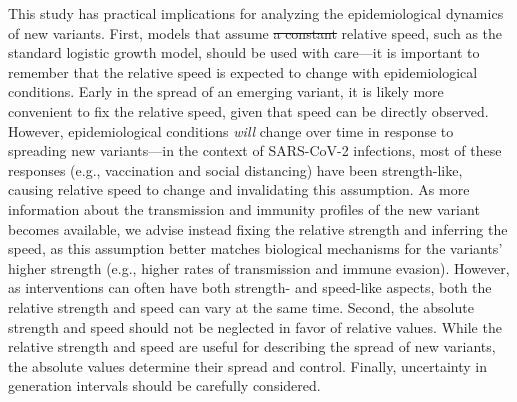 \documentclass[12pt]{article}
\providecommand{\DIFaddtex}[1]{{\protect\color{blue}\uwave{#1}}} %
\providecommand{\DIFdeltex}[1]{{\protect\color{red}\sout{#1}}}                      %
\providecommand{\DIFaddbegin}{} %
\providecommand{\DIFaddend}{} %
\providecommand{\DIFdelbegin}{} %
\providecommand{\DIFdelend}{} %
\providecommand{\DIFadd}[1]{\texorpdfstring{\DIFaddtex{#1}}{#1}} %
\providecommand{\DIFdel}[1]{\texorpdfstring{\DIFdeltex{#1}}{}} %
\newcommand{\DIFscaledelfig}{0.5}
\newlength{\DIFdelgraphicswidth} %
\newlength{\DIFdelgraphicsheight} %
\newcommand{\DIFaddincludegraphics}[2][]{{\color{blue}\fbox{\DIFOincludegraphics[#1]{#2}}}} %
\newcommand{\DIFdelincludegraphics}[2][]{%
\sbox{\DIFdelgraphicsbox}{\DIFOincludegraphics[#1]{#2}}%
\settoboxwidth{\DIFdelgraphicswidth}{\DIFdelgraphicsbox} %
\settoboxtotalheight{\DIFdelgraphicsheight}{\DIFdelgraphicsbox} %
\scalebox{\DIFscaledelfig}{%
\parbox[b]{\DIFdelgraphicswidth}{\usebox{\DIFdelgraphicsbox}\\[-\baselineskip] \rule{\DIFdelgraphicswidth}{0em}}\llap{\resizebox{\DIFdelgraphicswidth}{\DIFdelgraphicsheight}{%
\setlength{\unitlength}{\DIFdelgraphicswidth}%
\begin{picture}(1,1)%
\thicklines\linethickness{2pt} %
{\color[rgb]{1,0,0}\put(0,0){\framebox(1,1){}}}%
{\color[rgb]{1,0,0}\put(0,0){\line( 1,1){1}}}%
{\color[rgb]{1,0,0}\put(0,1){\line(1,-1){1}}}%
\end{picture}%
}\hspace*{3pt}}} %
} %
\DeclareRobustCommand{\DIFaddbegin}{\DIFOaddbegin \let\includegraphics\DIFaddincludegraphics} %
\DeclareRobustCommand{\DIFaddend}{\DIFOaddend \let\includegraphics\DIFOincludegraphics} %
\DeclareRobustCommand{\DIFdelbegin}{\DIFOdelbegin \let\includegraphics\DIFdelincludegraphics} %
\DeclareRobustCommand{\DIFdelend}{\DIFOaddend \let\includegraphics\DIFOincludegraphics} %
\begin{document}
This study has practical implications for analyzing the epidemiological dynamics of new variants.
First, models that assume \DIFdelbegin \DIFdel{a constant }\DIFdelend \DIFaddbegin \DIFadd{time-invariant }\DIFaddend relative speed, such as the standard logistic growth model, should be used with care---it is important to remember that the relative speed is expected to change with epidemiological conditions.
Early in the spread of an emerging variant, it is likely more convenient to fix the relative speed, given that speed can be directly observed.
However, epidemiological conditions \textit{will} change over time in response to spreading new variants---in the context of SARS-CoV-2 infections, most of these responses (e.g., vaccination and social distancing) have been strength-like, causing relative speed to change and invalidating this assumption.
As more information about the transmission and immunity profiles of the new variant becomes available, we advise instead fixing the relative strength and inferring the speed, as this assumption better matches biological mechanisms for the variants' higher strength (e.g., higher rates of transmission and immune evasion).
However, as interventions can often have both strength- and speed-like aspects, both the relative strength and speed can vary at the same time.
Second, the absolute strength and speed should not be neglected in favor of relative values.
While the relative strength and speed are useful for describing the spread of new variants, the absolute values determine their spread and control.
Finally, uncertainty in generation intervals should be carefully considered.
\end{document}
